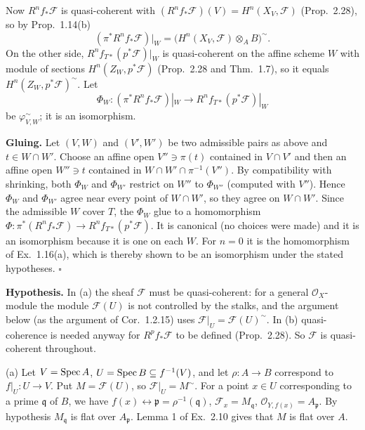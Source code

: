 \documentclass[11pt]{article}
\begin{document}
Now $R^nf_*\mathcal F$ is quasi-coherent with $(R^nf_*\mathcal F)(V)=H^n(X_V,\mathcal F)$ (Prop.~2.28), so by Prop.~1.14(b)
\[ (\pi^*R^nf_*\mathcal F)|_W=\bigl(H^n(X_V,\mathcal F)\otimes_AB\bigr)^\sim . \]
On the other side, $R^nf_{T*}(p^*\mathcal F)|_W$ is quasi-coherent on the affine scheme $W$ with module of sections $H^n(Z_W,p^*\mathcal F)$ (Prop.~2.28 and Thm.~1.7), so it equals $H^n(Z_W,p^*\mathcal F)^\sim$. Let
\[ \Phi_W:(\pi^*R^nf_*\mathcal F)|_W\to R^nf_{T*}(p^*\mathcal F)|_W \]
be $\varphi_{V,W}^\sim$; it is an isomorphism.

\textbf{Gluing.} Let $(V,W)$ and $(V',W')$ be two admissible pairs as above and $t\in W\cap W'$. Choose an affine open $V''\ni\pi(t)$ contained in $V\cap V'$ and then an affine open $W''\ni t$ contained in $W\cap W'\cap\pi^{-1}(V'')$. By compatibility with shrinking, both $\Phi_W$ and $\Phi_{W'}$ restrict on $W''$ to $\Phi_{W''}$ (computed with $V''$). Hence $\Phi_W$ and $\Phi_{W'}$ agree near every point of $W\cap W'$, so they agree on $W\cap W'$. Since the admissible $W$ cover $T$, the $\Phi_W$ glue to a homomorphism $\Phi:\pi^*(R^nf_*\mathcal F)\to R^nf_{T*}(p^*\mathcal F)$. It is canonical (no choices were made) and it is an isomorphism because it is one on each $W$. For $n=0$ it is the homomorphism of Ex.~1.16(a), which is thereby shown to be an isomorphism under the stated hypotheses. \hfill$\square$

\pf
\textbf{Hypothesis.} In (a) the sheaf $\mathcal F$ must be quasi-coherent: for a general $\mathcal O_X$-module the module $\mathcal F(U)$ is not controlled by the stalks, and the argument below (as the argument of Cor.~1.2.15) uses $\mathcal F|_U=\mathcal F(U)^\sim$. In (b) quasi-coherence is needed anyway for $R^pf_*\mathcal F$ to be defined (Prop.~2.28). So $\mathcal F$ is quasi-coherent throughout.

(a) Let $V=\operatorname{Spec} A$, $U=\operatorname{Spec} B\subseteq f^{-1}(V)$, and let $\rho:A\to B$ correspond to $f|_U:U\to V$. Put $M=\mathcal F(U)$, so $\mathcal F|_U=M^\sim$. For a point $x\in U$ corresponding to a prime $\mathfrak q$ of $B$, we have $f(x)\leftrightarrow\mathfrak p=\rho^{-1}(\mathfrak q)$, $\mathcal F_x=M_{\mathfrak q}$, $\mathcal O_{Y,f(x)}=A_{\mathfrak p}$. By hypothesis $M_{\mathfrak q}$ is flat over $A_{\mathfrak p}$. Lemma 1 of Ex.~2.10 gives that $M$ is flat over $A$.
\end{document}
